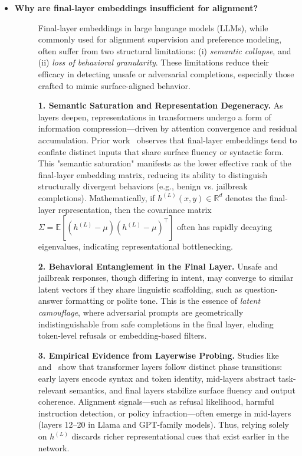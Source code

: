 \begin{itemize}[leftmargin=15pt,nolistsep]
\item[\ding{93}] { \selectfont \textbf{Why are final-layer embeddings insufficient for alignment?}}
\begin{description}
\item[] {\selectfont
Final-layer embeddings in large language models (LLMs), while commonly used for alignment supervision and preference modeling, often suffer from two structural limitations: (i) \emph{semantic collapse}, and (ii) \emph{loss of behavioral granularity}. These limitations reduce their efficacy in detecting unsafe or adversarial completions, especially those crafted to mimic surface-aligned behavior.

\textbf{1. Semantic Saturation and Representation Degeneracy.} As layers deepen, representations in transformers undergo a form of information compression—driven by attention convergence and residual accumulation. Prior work~\citep{belrose2023language, dong2021attention} observes that final-layer embeddings tend to conflate distinct inputs that share surface fluency or syntactic form. This "semantic saturation" manifests as the lower effective rank of the final-layer embedding matrix, reducing its ability to distinguish structurally divergent behaviors (e.g., benign vs. jailbreak completions). Mathematically, if \( h^{(L)}(x, y) \in \mathbb{R}^d \) denotes the final-layer representation, then the covariance matrix \( \Sigma = \mathbb{E}[(h^{(L)} - \mu)(h^{(L)} - \mu)^\top] \) often has rapidly decaying eigenvalues, indicating representational bottlenecking.

\textbf{2. Behavioral Entanglement in the Final Layer.} Unsafe and jailbreak responses, though differing in intent, may converge to similar latent vectors if they share linguistic scaffolding, such as question-answer formatting or polite tone. This is the essence of \textit{latent camouflage}, where adversarial prompts are geometrically indistinguishable from safe completions in the final layer, eluding token-level refusals or embedding-based filters.

\textbf{3. Empirical Evidence from Layerwise Probing.} Studies like~\citet{mu2023layers} and~\citet{nanda2023progress} show that transformer layers follow distinct phase transitions: early layers encode syntax and token identity, mid-layers abstract task-relevant semantics, and final layers stabilize surface fluency and output coherence. Alignment signals—such as refusal likelihood, harmful instruction detection, or policy infraction—often emerge in mid-layers (layers 12–20 in Llama and GPT-family models). Thus, relying solely on \( h^{(L)} \) discards richer representational cues that exist earlier in the network.

}
\end{description}
\end{itemize}
